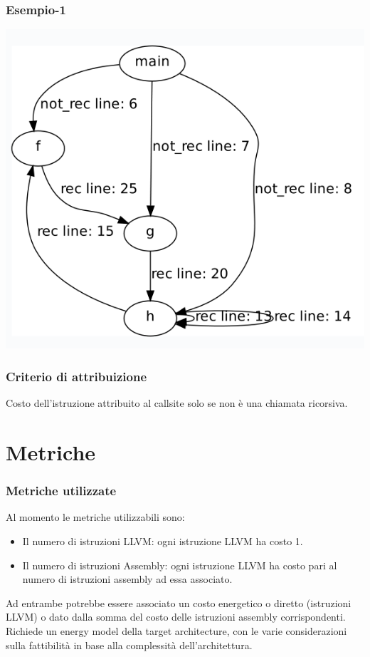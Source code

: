 \documentclass{beamer}
\begin{document}
\begin{frame}
\frametitle{Esempio-1}
\includegraphics[scale=0.45]{graph5.png}
\end{frame}

\begin{frame}
\frametitle{Criterio di attribuizione}
Costo dell'istruzione attribuito al callsite solo se non è una chiamata ricorsiva.
\end{frame}


\section{Metriche}

\begin{frame}
\frametitle{Metriche utilizzate}

Al momento le metriche utilizzabili sono:
\begin{itemize}
\item Il numero di istruzioni LLVM: ogni istruzione LLVM ha costo 1. \item Il numero di istruzioni Assembly: ogni istruzione LLVM ha costo pari al numero di istruzioni assembly ad essa associato. 
\end{itemize}
Ad entrambe potrebbe essere associato un costo energetico o diretto (istruzioni LLVM) o dato dalla somma del costo delle istruzioni assembly corrispondenti. \linebreak
Richiede un energy model della target architecture, con le varie considerazioni sulla fattibilità in base alla complessità dell'architettura.

\end{frame}
\end{document}
